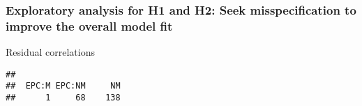 \documentclass[
]{article}
\newenvironment{Shaded}{\begin{snugshade}}{\end{snugshade}}
\newcommand{\CommentTok}[1]{\textcolor[rgb]{0.56,0.35,0.01}{\textit{#1}}}
\newcommand{\DataTypeTok}[1]{\textcolor[rgb]{0.13,0.29,0.53}{#1}}
\newcommand{\DecValTok}[1]{\textcolor[rgb]{0.00,0.00,0.81}{#1}}
\newcommand{\KeywordTok}[1]{\textcolor[rgb]{0.13,0.29,0.53}{\textbf{#1}}}
\newcommand{\NormalTok}[1]{#1}
\newcommand{\OperatorTok}[1]{\textcolor[rgb]{0.81,0.36,0.00}{\textbf{#1}}}
\newcommand{\StringTok}[1]{\textcolor[rgb]{0.31,0.60,0.02}{#1}}
\begin{document}
\newpage

\hypertarget{exploratory-analysis-for-h1-and-h2-seek-misspecification-to-improve-the-overall-model-fit}{%
\subsubsection{Exploratory analysis for H1 and H2: Seek misspecification
to improve the overall model
fit}\label{exploratory-analysis-for-h1-and-h2-seek-misspecification-to-improve-the-overall-model-fit}}

Residual correlations

\begin{Shaded}
\end{Shaded}

\begin{verbatim}
## 
##  EPC:M EPC:NM     NM 
##      1     68    138
\end{verbatim}
\end{document}
